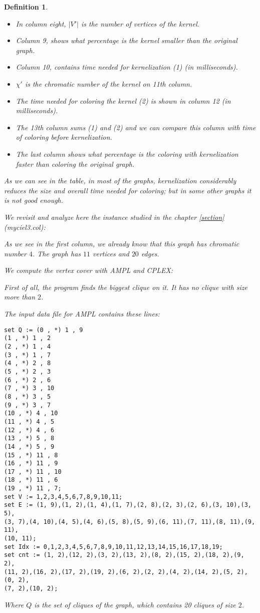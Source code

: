 \documentclass[12pt]{article}
\theoremstyle{slplain}
\newtheorem{defi}{Definition}
\begin{document}
\begin{defi}
\begin{itemize}
\item In column eight, $|V'|$ is the number of vertices of the kernel. 

\item Column 9, shows what percentage is the kernel smaller than the original graph.

\item Column 10, contains time needed for kernelization (1) (in milliseconds).

\item $\chi'$ is the chromatic number of the kernel on 11th column. 

\item The time needed for coloring the kernel (2) is shown in column 12 (in milliseconds). 

\item The 13th column sums (1) and (2) and we can compare this column with time of coloring before kernelization.

\item The last column shows what percentage is the coloring with kernelization faster than coloring the original graph.
\end{itemize}

As we can see in the table, in most of the graphs, kernelization considerably reduces the size and overall time needed for coloring; but in some other graphs it is not good enough.

We revisit and analyze here the instance studied in the chapter \ref{section} (myciel3.col):
     
As we see in the first column, we already know that this graph has chromatic number $4$. The graph has $11$ vertices and $20$ edges. 

We compute the vertex cover with AMPL and CPLEX: 

First of all, the program finds the biggest clique on it. It has no clique with size more than $2$.

The input data file for AMPL contains these lines:
\newpage
{\small 
\begin{verbatim}
set Q := (0 , *) 1 , 9
(1 , *) 1 , 2
(2 , *) 1 , 4
(3 , *) 1 , 7
(4 , *) 2 , 8
(5 , *) 2 , 3
(6 , *) 2 , 6
(7 , *) 3 , 10
(8 , *) 3 , 5
(9 , *) 3 , 7
(10 , *) 4 , 10
(11 , *) 4 , 5
(12 , *) 4 , 6
(13 , *) 5 , 8
(14 , *) 5 , 9
(15 , *) 11 , 8
(16 , *) 11 , 9
(17 , *) 11 , 10
(18 , *) 11 , 6
(19 , *) 11 , 7;
set V := 1,2,3,4,5,6,7,8,9,10,11;
set E := (1, 9),(1, 2),(1, 4),(1, 7),(2, 8),(2, 3),(2, 6),(3, 10),(3, 5),
(3, 7),(4, 10),(4, 5),(4, 6),(5, 8),(5, 9),(6, 11),(7, 11),(8, 11),(9, 11),
(10, 11);
set Idx := 0,1,2,3,4,5,6,7,8,9,10,11,12,13,14,15,16,17,18,19;
set cnt := (1, 2),(12, 2),(3, 2),(13, 2),(8, 2),(15, 2),(18, 2),(9, 2),
(11, 2),(16, 2),(17, 2),(19, 2),(6, 2),(2, 2),(4, 2),(14, 2),(5, 2),(0, 2),
(7, 2),(10, 2);
\end{verbatim}
}
Where $Q$ is the set of cliques of the graph, which contains 20 cliques of size $2$.


\end{defi}
\end{document}
